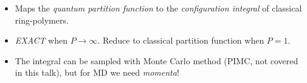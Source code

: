 \begin{frame}[allowframebreaks]
\begin{figure}
{}
\end{figure}
  \begin{itemize}
    \item Maps the \emph{quantum partition function} to the \emph{configuration integral} of 
      classical ring-polymers.
    \item \emph{EXACT} when $P \to \infty$. Reduce to classical partition function when $P = 1$.
    \item The integral can be sampled with Monte Carlo method (PIMC, not
      covered in this talk), but for MD
    we need \emph{momenta}!
  \end{itemize}
\end{frame}

